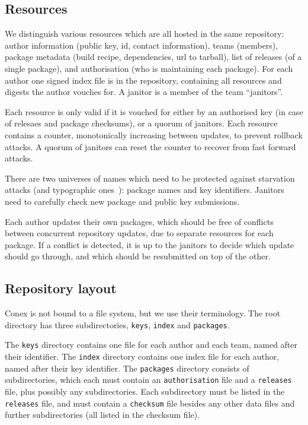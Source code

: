 \documentclass[nocopyrightspace]{sigplanconf}
\begin{document}
\subsection{Resources}
We distinguish various resources which are all hosted in the same repository:
author information (public key, id, contact information), teams (members), package metadata (build recipe, dependencies, url to tarball), list of releases (of a single package), and authorisation (who is maintaining each package).
For each author one signed index file is in the repository, containing all resources and digests the author vouches for.
A janitor is a member of the team ``janitors''.

Each resource is only valid if it is vouched for either by an authorised key (in case of relesaes and package checksums), or a quorum of janitors.
Each resource contains a counter, monotonically increasing between updates, to prevent rollback attacks.
A quorum of janitors can reset the counter to recover from fast forward attacks.

There are two universes of names which need to be protected against starvation attacks (and typographic ones~\cite{typo}): package names and key identifiers.
Janitors need to carefully check new package and public key submissions.

Each author updates their own packages, which should be free of conflicts between concurrent repository updates, due to separate resources for each package.
If a conflict is detected, it is up to the janitors to decide which update should go through, and which should be resubmitted on top of the other.

\subsection{Repository layout}
Conex is not bound to a file system, but we use their terminology.
The root directory has three subdirectories, \texttt{keys}, \texttt{index} and \texttt{packages}.

The \texttt{keys} directory contains one file for each author and each team, named after their identifier.
The \texttt{index} directory contains one index file for each author, named after their key identifier.
The \texttt{packages} directory consists of subdirectories, which each must contain an \texttt{authorisation} file and a \texttt{releases} file, plus possibly any subdirectories.
Each subdirectory must be listed in the \texttt{releases} file, and must contain a \texttt{checksum} file besides any other data files and further subdirectories (all listed in the checksum file).
\end{document}
